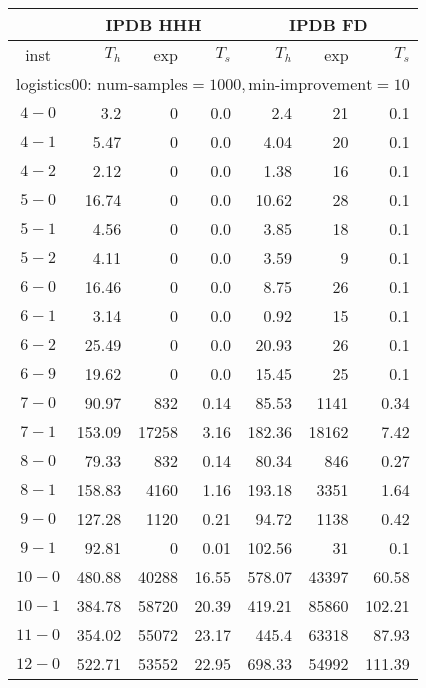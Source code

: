 \begin{longtable}{|c||r|r|r||r|r|r|}\firsthline
& \multicolumn{3}{c||}{IPDB HHH} & \multicolumn{3}{c||}{IPDB FD}\\\hline
inst & $T_h$ & exp & $T_s$ & $T_h$ & exp & $T_s$\\\hline
\multicolumn{7}{|l|}{logistics00: $\text{num-samples}=1000,\text{min-improvement}=10$}\\\hline
$4-0$ & 3.2 & 0 & 0.0 & 2.4 & 21 & 0.1 \\\hline
$4-1$ & 5.47 & 0 & 0.0 & 4.04 & 20 & 0.1 \\\hline
$4-2$ & 2.12 & 0 & 0.0 & 1.38 & 16 & 0.1 \\\hline
$5-0$ & 16.74 & 0 & 0.0 & 10.62 & 28 & 0.1 \\\hline
$5-1$ & 4.56 & 0 & 0.0 & 3.85 & 18 & 0.1 \\\hline
$5-2$ & 4.11 & 0 & 0.0 & 3.59 & 9 & 0.1 \\\hline
$6-0$ & 16.46 & 0 & 0.0 & 8.75 & 26 & 0.1 \\\hline
$6-1$ & 3.14 & 0 & 0.0 & 0.92 & 15 & 0.1 \\\hline
$6-2$ & 25.49 & 0 & 0.0 & 20.93 & 26 & 0.1 \\\hline
$6-9$ & 19.62 & 0 & 0.0 & 15.45 & 25 & 0.1 \\\hline
$7-0$ & 90.97 & 832 & 0.14 & 85.53 & 1141 & 0.34 \\\hline
$7-1$ & 153.09 & 17258 & 3.16 & 182.36 & 18162 & 7.42 \\\hline
$8-0$ & 79.33 & 832 & 0.14 & 80.34 & 846 & 0.27 \\\hline
$8-1$ & 158.83 & 4160 & 1.16 & 193.18 & 3351 & 1.64 \\\hline
$9-0$ & 127.28 & 1120 & 0.21 & 94.72 & 1138 & 0.42 \\\hline
$9-1$ & 92.81 & 0 & 0.01 & 102.56 & 31 & 0.1 \\\hline
$10-0$ & 480.88 & 40288 & 16.55 & 578.07 & 43397 & 60.58 \\\hline
$10-1$ & 384.78 & 58720 & 20.39 & 419.21 & 85860 & 102.21 \\\hline
$11-0$ & 354.02 & 55072 & 23.17 & 445.4 & 63318 & 87.93 \\\hline
$12-0$ & 522.71 & 53552 & 22.95 & 698.33 & 54992 & 111.39 \\\hline


\end{longtable}
